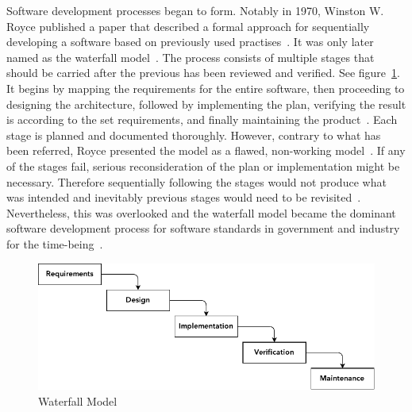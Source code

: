 \documentclass[english]{tktltiki2}
\begin{document}
Software development processes began to form. Notably in 1970, Winston W. Royce published a paper that described a formal approach for sequentially developing a software based on previously used practises~\cite{Roy70}. It was only later named as the waterfall model~\cite{Boe88, LB03}. The process consists of multiple stages that should be carried after the previous has been reviewed and verified. See figure~\ref{figure:waterfall-model}. It begins by mapping the requirements for the entire software, then proceeding to designing the architecture, followed by implementing the plan, verifying the result is according to the set requirements, and finally maintaining the product~\cite{Roy70}. Each stage is planned and documented thoroughly. However, contrary to what has been referred, Royce presented the model as a flawed, non-working model~\cite{Roy70}. If any of the stages fail, serious reconsideration of the plan or implementation might be necessary. Therefore sequentially following the stages would not produce what was intended and inevitably previous stages would need to be revisited~\cite{Roy70}. Nevertheless, this was overlooked and the waterfall model became the dominant software development process for software standards in government and industry for the time-being~\cite{Boe88, LB03}.

\begin{figure}[h!]

    \vspace{1cm}
    \centering

    \includegraphics{figures/waterfall-model}

    \caption{Waterfall Model}
    \label{figure:waterfall-model}

    \vspace{1cm}

\end{figure}
\end{document}
